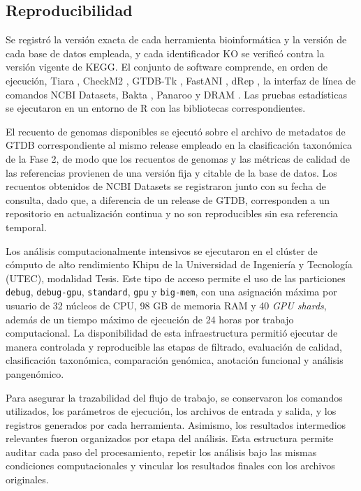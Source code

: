 \subsection{Reproducibilidad}
Se registró la versión exacta de cada herramienta bioinformática y la versión de cada base de datos empleada, y cada identificador KO se verificó contra la versión vigente de KEGG. El conjunto de software comprende, en orden de ejecución, Tiara \cite{karlicki2022tiara}, CheckM2 \cite{checkm2}, GTDB-Tk \cite{gtdbtk2019}, FastANI \cite{fastANI2018}, dRep \cite{olm2017}, la interfaz de línea de comandos NCBI Datasets, Bakta \cite{schwengers2021}, Panaroo \cite{panaroo2020} y DRAM \cite{dram2020}. Las pruebas estadísticas se ejecutaron en un entorno de R con las bibliotecas correspondientes.

El recuento de genomas disponibles se ejecutó sobre el archivo de metadatos de GTDB correspondiente al mismo release empleado en la clasificación taxonómica de la Fase 2, de modo que los recuentos de genomas y las métricas de calidad de las referencias provienen de una versión fija y citable de la base de datos. Los recuentos obtenidos de NCBI Datasets se registraron junto con su fecha de consulta, dado que, a diferencia de un release de GTDB, corresponden a un repositorio en actualización continua y no son reproducibles sin esa referencia temporal.

Los análisis computacionalmente intensivos se ejecutaron en el clúster de cómputo de alto rendimiento Khipu de la Universidad de Ingeniería y Tecnología (UTEC), modalidad Tesis. Este tipo de acceso permite el uso de las particiones \texttt{debug}, \texttt{debug-gpu}, \texttt{standard}, \texttt{gpu} y \texttt{big-mem}, con una asignación máxima por usuario de 32 núcleos de CPU, 98 GB de memoria RAM y 40 \textit{GPU shards}, además de un tiempo máximo de ejecución de 24 horas por trabajo computacional. La disponibilidad de esta infraestructura permitió ejecutar de manera controlada y reproducible las etapas de filtrado, evaluación de calidad, clasificación taxonómica, comparación genómica, anotación funcional y análisis pangenómico.

Para asegurar la trazabilidad del flujo de trabajo, se conservaron los comandos utilizados, los parámetros de ejecución, los archivos de entrada y salida, y los registros generados por cada herramienta. Asimismo, los resultados intermedios relevantes fueron organizados por etapa del análisis. Esta estructura permite auditar cada paso del procesamiento, repetir los análisis bajo las mismas condiciones computacionales y vincular los resultados finales con los archivos originales.


